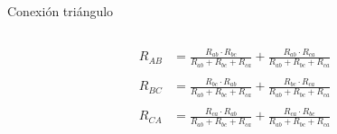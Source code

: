 \documentclass[aspectratio=169, xcolor={usenames,svgnames,dvipsnames}]{beamer}
\begin{document}
\begin{frame}{Conexión triángulo}
\begin{columns}
\begin{column}{0.5\columnwidth}
    \begin{align*}
      R_{AB} &= \frac{R_{ab} \cdot R_{bc}}{R_{ab} + R_{bc} + R_{ca}} + \frac{R_{ab} \cdot R_{ca}}{R_{ab} + R_{bc} + R_{ca}}\\
      \\
      R_{BC} &= \frac{R_{bc} \cdot R_{ab}}{R_{ab} + R_{bc} + R_{ca}} + \frac{R_{bc} \cdot R_{ca}}{R_{ab} + R_{bc} + R_{ca}}\\
      \\
      R_{CA} &= \frac{R_{ca} \cdot R_{ab}}{R_{ab} + R_{bc} + R_{ca}} + \frac{R_{ca} \cdot R_{bc}}{R_{ab} + R_{bc} + R_{ca}}
    \end{align*}
    \end{column}
    \end{columns}
\end{frame}

\end{document}
